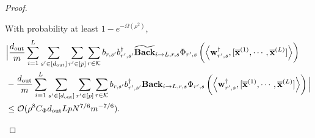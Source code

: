 \begin{claim}
\begin{proof}
				\begin{claim}\label{claim:fbacktildeback_proof}
					With probability at least $1 - e^{-\Omega(\rho^2)}$,
					\begin{align*}
						&\Big| \frac{d_{\mathrm{out}} }{m} \sum_{i=1}^{L}  \sum_{s' \in [d_{\mathrm{out}} ]} \sum_{r' \in [p]} \sum_{r \in \mathcal{K}}  b_{r, s'} b_{r', s'}^{\dagger} \widetilde{\mathbf{Back}}_{i \to L, r, s} \Phi_{r', s} \left(\left\langle \mathbf{w}_{r', s}^{\dagger}, [\overline{\mathbf{x}}^{(1)}, \cdots, \overline{\mathbf{x}}^{(L)}]\right\rangle\right) \\& - \frac{d_{\mathrm{out}} }{m} \sum_{i=1}^{L}  \sum_{s' \in [d_{\mathrm{out}} ]} \sum_{r' \in [p]} \sum_{r \in \mathcal{K}}  b_{r, s'} b_{r', s'}^{\dagger} \mathbf{Back}_{i \to L, r, s} \Phi_{r', s} \left(\left\langle \mathbf{w}_{r', s}^{\dagger}, [\overline{\mathbf{x}}^{(1)}, \cdots, \overline{\mathbf{x}}^{(L)}]\right\rangle\right) \Big| \\& \le \mathcal{O}(\rho^8 C_{\Phi} d_{\mathrm{out}} Lp N^{7/6} m^{-7/6}). 
					\end{align*}
				\end{claim}
				

\end{proof}
\end{claim}
